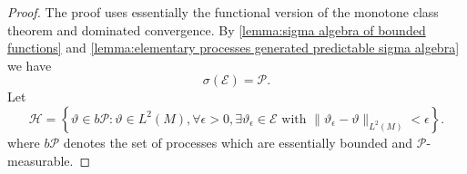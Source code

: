 \documentclass[11pt,a4paper,twoside,openany]{report}
\theoremstyle{plain} %
\theoremstyle{definition} %
\theoremstyle{remark} %
\begin{document}
\begin{proof}
    The proof uses essentially the functional version of the monotone class theorem and dominated convergence. By \cref{lemma:sigma algebra of bounded functions} and \cref{lemma:elementary processes generated predictable sigma algebra} we have 
    \begin{equation}
        \sigma(\mathcal{E})=\mathcal{P}.
    \end{equation}
    Let 
    \begin{equation}
        \mathcal{H}=\left\{ \vartheta\in b\mathcal{P}:\vartheta\in L^2(M),\forall \epsilon>0, \exists \vartheta_{\epsilon}\in \mathcal{E}\text{ with }\lVert \vartheta_{\epsilon}-\vartheta\rVert_{L^2(M)}<\epsilon\right\}.
    \end{equation}
    where \(b\mathcal{P}\) denotes the set of processes which are essentially bounded and \(\mathcal{P}\)-measurable.


\end{proof}
\end{document}
